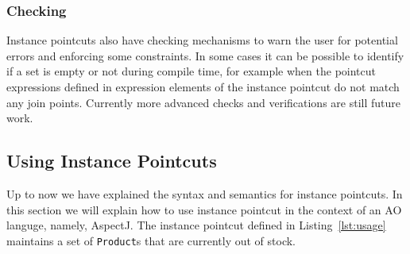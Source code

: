 \documentclass{acm_proc_article-sp}
\begin{document}
%
%
%
%
%

\subsubsection{Checking}
Instance pointcuts also have checking mechanisms to warn the user for potential errors and enforcing some constraints. In some cases it can be possible to identify if a set is empty or not during compile time, for example when the pointcut expressions defined in expression elements of the instance pointcut do not match any join points. 
Currently more advanced checks and verifications are still future work.

\subsection{Using Instance Pointcuts}
Up to now we have explained the syntax and semantics for instance pointcuts. In this section we will explain how to use instance pointcut in the context of an AO languge, namely, AspectJ. The instance pointcut defined in Listing~\ref{lst:usage} maintains a set of \lstinline{Product}s that are currently out of stock.
\end{document}
